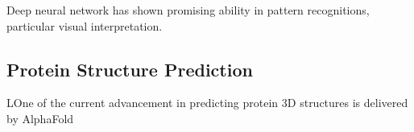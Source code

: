 Deep neural network has shown promising ability in pattern recognitions, particular visual interpretation.
\par 

\subsection{Protein Structure Prediction}
LOne of the current advancement in predicting protein 3D structures is delivered by AlphaFold